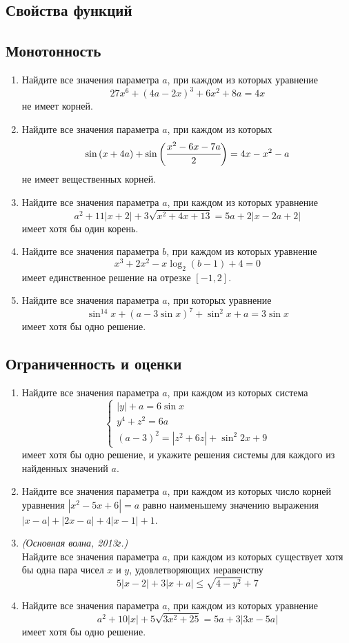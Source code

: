 \documentclass[12pt]{article}
\begin{document}




\subsection{Свойства функций}

\subsection*{Монотонность}
 \begin{enumerate}[start=1,label={\itshape\bfseries \arabic*.}]
    \item Найдите все значения параметра $a$, при каждом из которых уравнение
    $$27 x^6 + (4a - 2x)^3 + 6x^2 + 8a = 4x$$
    не имеет корней.
    \item Найдите все значения параметра $a$, при каждом из которых
    $$\sin{(x + 4a)} + \sin{\bigg(\cfrac{x^2 - 6x - 7a}{2}\bigg)} = 4x - x^2 - a$$
    не имеет вещественных корней.
    \item Найдите все значения параметра $a$, при каждом из которых уравнение
    $$a^2 + 11|x + 2| + 3\sqrt{x^2 + 4x + 13} = 5a + 2|x - 2a + 2|$$
    имеет хотя бы один корень.
    \item Найдите все значения параметра $b$, при каждом из которых уравнение
    $$x^3 + 2x^2 - x\log_2{(b - 1)} + 4 = 0$$
    имеет единственное решение на отрезке $[-1, 2]$.
    \item Найдите все значения параметра $a$, при которых уравнение
    $$\sin^{14}{x} + (a - 3\sin{x})^7 + \sin^2{x} + a = 3\sin{x}$$
    имеет хотя бы одно решение.
\end{enumerate}
\subsection*{Ограниченность и оценки}
 \begin{enumerate}[start=1,label={\itshape\bfseries \arabic*.}]
    \item Найдите все значения параметра $a$, при каждом из которых система
    $$\begin{cases}|y| + a = 6\sin{x} \\ y^4 + z^2 = 6a \\ (a - 3)^2 = |z^2 + 6z| + \sin^2{2x} + 9 \end{cases}$$
    имеет хотя бы одно решение, и укажите решения системы для каждого из найденных значений $a$.
    \item Найдите все значения параметра $a$, при каждом из которых число корней уравнения $|x^2 -5x + 6| = a$ равно наименьшему значению выражения $|x - a| + |2x - a| + 4|x - 1| + 1$.
    \item \textit{(Основная волна, 2013г.)}\\
    Найдите все значения параметра $a$, при каждом из которых существует хотя бы одна пара чисел $x$ и $y$, удовлетворяющих неравенству
    $$5|x - 2| + 3|x + a| \le \sqrt{4 - y^2} + 7$$
    \item Найдите все значения параметра $a$, при каждом из которых уравнение
    $$ a^2 + 10|x| + 5\sqrt{3x^2 + 25} = 5a + 3|3x - 5a|$$
    имеет хотя бы одно решение.
\end{enumerate}
\end{document}
